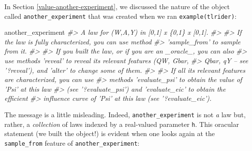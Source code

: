 \documentclass[11pt,openright,twoside]{book}
\newenvironment{Shaded}{\begin{snugshade}}{\end{snugshade}}
\newcommand{\CommentTok}[1]{\textcolor[rgb]{0.56,0.35,0.01}{\textit{#1}}}
\newcommand{\NormalTok}[1]{#1}
\theoremstyle{definition}
\theoremstyle{definition}
\theoremstyle{definition}
\theoremstyle{remark}
\begin{document}
In Section \ref{value-another-experiment}, we discussed the nature of the
object called \texttt{another\_experiment} that was created when we ran
\texttt{example(tlrider)}:

\begin{Shaded}
\begin{Highlighting}[]
\NormalTok{another_experiment}
\CommentTok{#> A law for (W,A,Y) in [0,1] x \{0,1\} x [0,1].}
\CommentTok{#> }
\CommentTok{#> If the law is fully characterized, you can use method}
\CommentTok{#> 'sample_from' to sample from it.}
\CommentTok{#> }
\CommentTok{#> If you built the law, or if you are an _oracle_, you can also}
\CommentTok{#> use methods 'reveal' to reveal its relevant features (QW, Gbar,}
\CommentTok{#> Qbar, qY -- see '?reveal'), and 'alter' to change some of them.}
\CommentTok{#> }
\CommentTok{#> If all its relevant features are characterized, you can use}
\CommentTok{#> methods 'evaluate_psi' to obtain the value of 'Psi' at this law}
\CommentTok{#> (see '?evaluate_psi') and 'evaluate_eic' to obtain the efficient}
\CommentTok{#> influence curve of 'Psi' at this law (see '?evaluate_eic').}
\end{Highlighting}
\end{Shaded}

The message is a little misleading. Indeed, \texttt{another\_experiment} is not \emph{a}
law but, rather, a \emph{collection} of laws indexed by a real-valued parameter
\texttt{h}. This oracular statement (we built the object!) is evident when one looks
again at the \texttt{sample\_from} feature of \texttt{another\_experiment}:
\end{document}
